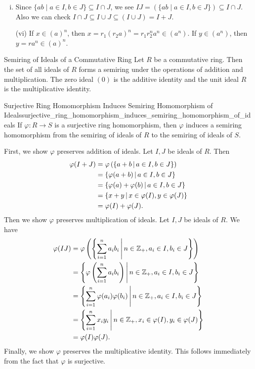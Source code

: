 \begin{prf}
    \begin{enumerate}[(i)]
        \item Since $\{ab\mid a\in I,b\in J\}\subseteq I\cap J$, we see $IJ=\left(\{ab\mid a\in I,b\in J\}\right)\subseteq I\cap J$. Also we can check $I \cap J \subseteq I \cup J\subseteq (I \cup J)=I+J$.
        \item[(vi)] If $x\in(a)^n$, then $x=r_1(r_2a)^n=r_1r_2^na^n\in(a^n)$. If $y\in(a^n)$, then $y=ra^n\in(a)^n$.
    \end{enumerate}
\end{prf}

\begin{definition}{Semiring of Ideals of a Commutative Ring}{}
    Let $R$ be a commutative ring. Then the set of all ideals of $R$ forms a semiring under the operations of addition and multiplication. The zero ideal $(0)$ is the additive identity and the unit ideal $R$ is the multiplicative identity. 
\end{definition}

\begin{proposition}{Surjective Ring Homomorphism Induces Semiring Homomorphism of Ideals}{surjective_ring_homomorphism_induces_semiring_homomorphism_of_ideals}
    If $\varphi:R\to S$ is a surjective ring homomorphism, then $\varphi$ induces a semiring homomorphism from the semiring of ideals of $R$ to the semiring of ideals of $S$.
\end{proposition}
\begin{prf}
    First, we show $\varphi$ preserves addition of ideals. Let $I,J$ be ideals of $R$. Then
    \begin{align*}
        \varphi(I+J)&=\varphi\left(\left\{a+b\,\middle\vert\, a\in I,b\in J\right\}\right)\\
        &=\left\{\varphi(a+b)\,\middle\vert\, a\in I,b\in J\right\}\\
        &=\left\{\varphi(a)+\varphi(b)\,\middle\vert\, a\in I,b\in J\right\}\\
        &=\left\{x+y\,\middle\vert\, x\in \varphi(I),y\in \varphi(J)\right\}\\
        &=\varphi(I)+\varphi(J).
    \end{align*}
    Then we show $\varphi$ preserves multiplication of ideals. Let $I,J$ be ideals of $R$. We have
    \begin{align*}
        \varphi(IJ)&=\varphi\left(\left\{\sum_{i=1}^n a_ib_i\,\middle\vert\, n\in\mathbb{Z}_{+},a_i\in I,b_i\in J\right\}\right)\\
        &=\left\{\varphi\left(\sum_{i=1}^n a_ib_i\right)\,\middle\vert\, n\in\mathbb{Z}_{+},a_i\in I,b_i\in J\right\}\\
        &=\left\{\sum_{i=1}^n \varphi(a_i)\varphi(b_i)\,\middle\vert\, n\in\mathbb{Z}_{+},a_i\in I,b_i\in J\right\}\\
        &=\left\{\sum_{i=1}^n x_iy_i\,\middle\vert\, n\in\mathbb{Z}_{+}, x_i\in \varphi(I),y_i\in \varphi(J)\right\}\\
        &=\varphi(I)\varphi(J).
    \end{align*}
    Finally, we show $\varphi$ preserves the multiplicative identity. This follows immediately from the fact that $\varphi$ is surjective.
\end{prf}

